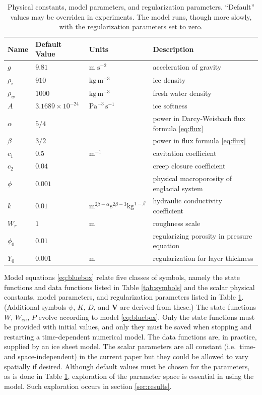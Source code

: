 \documentclass[11pt,final]{amsart}
\newcommand\bV{\mathbf{V}}
\begin{document}
\begin{table}[ht]
  \centering
  \caption{Physical constants, model parameters, and regularization parameters.  ``Default'' values may be overriden in experiments.  The model runs, though more slowly, with the regularization parameters set to zero.}
  \begin{tabular}{lllp{3.0in}} 
    \textbf{Name} & \textbf{Default Value} & \textbf{Units} & \textbf{Description}\\
\hline
    $g$ & $9.81$ & m $\text{s}^{-2}$ & acceleration of gravity \\
    $\rho_i$ & $910$ & $\text{kg}\,\text{m}^{-3}$ & ice density \citep{GreveBlatter2009} \\
    $\rho_w$ & $1000$ & $\text{kg}\,\text{m}^{-3}$ & fresh water density \citep{GreveBlatter2009} \\
    \hline
    $A$ & $3.1689\times 10^{-24}$ & $\text{Pa}^{-3}\,\text{s}^{-1}$ & ice softness \citep{EISMINT96} \phantom{$\Big|$} \\
    $\alpha$ & $5/4$ & & power in Darcy-Weisbach flux formula \eqref{eq:flux} \\
    $\beta$ & $3/2$ & & power in flux formula \eqref{eq:flux} \\
    $c_1$ & $0.5$ & $\text{m}^{-1}$ & cavitation coefficient \\
    $c_2$ & $0.04$ & & creep closure coefficient \\
    $\phi$ & $0.001$ & & physical macroporosity of englacial system \\
    $k$ & $0.01$ & $\text{m}^{2\beta-\alpha} \text{s}^{2\beta-3} \text{kg}^{1-\beta}$ & hydraulic conductivity coefficient \\
    $W_r$ & $1$ & $\text{m}$ & roughness scale \\
    \hline
    $\phi_0$ & $0.01$ & & regularizing porosity in pressure equation \\
    $Y_0$ & $0.001$ & m & regularization for layer thickness \\
    \hline
  \end{tabular}
 \label{tab:constants}
\end{table}

Model equations \eqref{eq:bluebox} relate five classes of symbols, namely the state functions and data functions listed in Table \ref{tab:symbols} and the scalar physical constants, model parameters, and regularization parameters listed in Table \ref{tab:constants}.  (Additional symbols $\psi$, $K$, $D$, and $\bV$ are derived from these.)  The state functions $W$, $W_{en}$, $P$ evolve according to model \eqref{eq:bluebox}.  Only the state functions must be provided with initial values, and only they must be saved when stopping and restarting a time-dependent numerical model.  The data functions are, in practice, supplied by an ice sheet model.  The scalar parameters are all constant (i.e.~time- and space-independent) in the current paper but they could be allowed to vary spatially if desired.  Although default values must be chosen for the parameters, as is done in Table \ref{tab:constants}, exploration of the parameter space is essential in using the model.  Such exploration occurs in section \ref{sec:results}.
\end{document}

